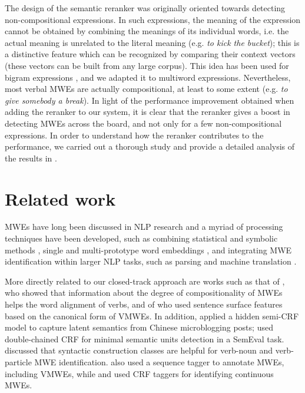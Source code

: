 \documentclass[output=paper
,modfonts
,nonflat]{langsci/langscibook}
\begin{document}
The design of the semantic reranker was originally oriented towards detecting non-compositional expressions. In such expressions, the meaning of the expression cannot be obtained by combining the meanings of its individual words, i.e. the actual meaning is unrelated to the literal meaning (e.g. {\em to kick the bucket}); this is a distinctive feature which can be recognized by comparing their context vectors (these vectors can be built from any large corpus). This idea has been used for bigram expressions \citep{schutze1998,maldonado2011}, and we adapted it to multiword expressions. Nevertheless, most verbal MWEs are actually compositional, at least to some extent (e.g. {\em to give somebody a break}). In light of the performance improvement obtained when adding the reranker to our system, it is clear that the reranker gives a boost in detecting MWEs across the board, and not only for a few non-compositional expressions. In order to understand how the reranker contributes to the performance, we carried out a thorough study and provide a detailed analysis of the results in .





\section{Related work}

MWEs have long been discussed in NLP research and a myriad of processing techniques have been developed, such as combining statistical and symbolic methods \citep{Sag2002a}, single and multi-prototype word embeddings \citep{conf/naacl/SalehiCB15}, and integrating MWE identification within larger NLP tasks, such as parsing \citep{green:emnlp:2011,Green:2013:PMI:2464100.2464109,Constant2012} and machine translation \citep{Tsvetkov:2010:EME:1944566.1944710,DBLP:conf/emnlp/SalehiCB14,DBLP:conf/eacl/SalehiCB14}. 


More directly related to our closed-track approach are works such as that of  \cite{Venkatapathy:2006:UIM:1613692.1613697}, who showed that information about the degree of compositionality of MWEs helps the word alignment of verbs, and of \cite{BoukobzaR09} who used sentence surface features based on the canonical form of VMWEs. In addition, \cite{conf/ialp/SunLTR13} applied a hidden semi-CRF model to capture latent semantics from Chinese microblogging posts; \cite{DBLP:conf/semeval/HosseiniSL16} used double-chained CRF for minimal semantic units detection in a SemEval task. \cite{Bar2014} discussed that syntactic construction classes are helpful for verb-noun and verb-particle MWE identification. \cite{Schneider14b} also used a sequence tagger to annotate MWEs, including VMWEs, while \cite{blunsom-baldwin:2006:EMNLP} and \cite{wiki50} used CRF taggers for identifying continuous MWEs. 
\end{document}
